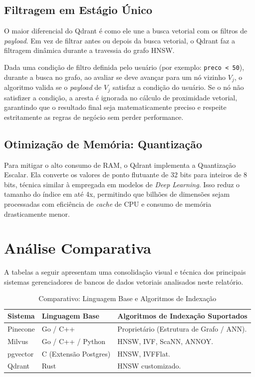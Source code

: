\documentclass[a4paper, 12pt]{article}
\begin{document}
\subsection{Filtragem em Estágio Único}
O maior diferencial do Qdrant é como ele une a busca vetorial com os filtros de \textit{payload}. Em vez de filtrar antes ou depois da busca vetorial, o Qdrant faz a filtragem dinâmica durante a travessia do grafo HNSW.

Dada uma condição de filtro definida pelo usuário (por exemplo: \texttt{preco < 50}), durante a busca no grafo, ao avaliar se deve avançar para um nó vizinho $V_{j}$, o algoritmo valida se o \textit{payload} de $V_{j}$ satisfaz a condição do usuário. Se o nó não satisfizer a condição, a aresta é ignorada no cálculo de proximidade vetorial, garantindo que o resultado final seja matematicamente preciso e respeite estritamente as regras de negócio sem perder performance.

\subsection{Otimização de Memória: Quantização}
Para mitigar o alto consumo de RAM, o Qdrant implementa a Quantização Escalar. Ela converte os valores de ponto flutuante de 32 bits para inteiros de 8 bits, técnica similar à empregada em modelos de \textit{Deep Learning}. Isso reduz o tamanho do índice em até 4x, permitindo que bilhões de dimensões sejam processadas com eficiência de \textit{cache} de CPU e consumo de memória drasticamente menor.

\section{Análise Comparativa}
\label{sec:analise_comparativa}

A tabelas a seguir apresentam uma consolidação visual e técnica dos principais sistemas gerenciadores de bancos de dados vetoriais analisados neste relatório.

\begin{table}[H]
\centering
\caption{Comparativo: Linguagem Base e Algoritmos de Indexação}
\begin{tabularx}{\textwidth}{l l X}
\toprule
\textbf{Sistema} & \textbf{Linguagem Base} & \textbf{Algoritmos de Indexação Suportados} \\
\midrule
Pinecone & Go / C++ & Proprietário (Estrutura de Grafo / ANN). \\
Milvus & Go / C++ / Python & HNSW, IVF, ScaNN, ANNOY. \\
pgvector & C (Extensão Postgres) & HNSW, IVFFlat. \\
Qdrant & Rust & HNSW customizado. \\
\bottomrule
\end{tabularx}
\end{table}
\end{document}
